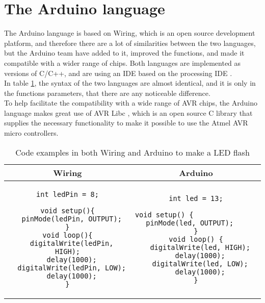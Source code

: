 \section{The Arduino language}
The Arduino language is based on Wiring, which is an open source development platform, and therefore there are a lot of similarities between the two languages, but the Arduino team have added to it, improved the functions, and made it compatible with a wider range of chips. Both languages are implemented as versions of C/C++, and are using an IDE based on the processing IDE \cite{Wiring:thesis}\cite{Arduino:IDE}.\\

In table \ref{tabel:comparison}, the syntax of the two languages are almost identical, and it is only in the functions parameters, that there are any noticeable difference.\\ 
To help facilitate the compatibility with a wide range of AVR chips, the Arduino language makes great use of AVR Libc \cite{AVR:lib}, which is an open source C library that supplies the necessary functionality to make it possible to use the Atmel AVR micro controllers.\\

\begin{table}[H]
\centering
\begin{tabular}{cc}
Wiring 
& 
Arduino \\ 
\hline 
\begin{lstlisting}
int ledPin = 8;

void setup(){
  pinMode(ledPin, OUTPUT);
}
void loop(){
  digitalWrite(ledPin, HIGH);
  delay(1000);
  digitalWrite(ledPin, LOW);
  delay(1000);
}
\end{lstlisting}  
& 
\begin{lstlisting}
int led = 13;

void setup() {                
  pinMode(led, OUTPUT);     
}
void loop() {
  digitalWrite(led, HIGH);
  delay(1000);
  digitalWrite(led, LOW);
  delay(1000);
}
\end{lstlisting} 
\end{tabular} 
\caption{Code examples in both Wiring and Arduino to make a LED flash}
\label{tabel:comparison}
\end{table}

